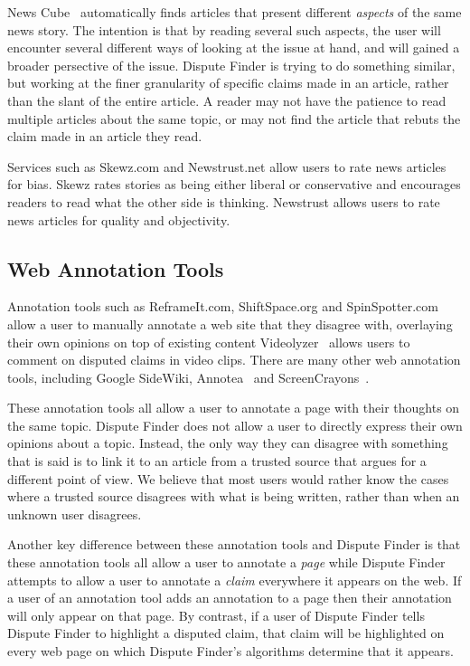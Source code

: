 \documentclass{www2010-submission}
\begin{document}
News Cube~\cite{Park2009} automatically finds articles that present different {\it aspects} of the same news story. The intention is that by reading several such aspects, the user will encounter several different ways of looking at the issue at hand, and will gained a broader persective of the issue. Dispute Finder is trying to do something similar, but working at the finer granularity of specific claims made in an article, rather than the slant of the entire article. A reader may not have the patience to read multiple articles about the same topic, or may not find the article that rebuts the claim made in an article they read. 

Services such as Skewz.com and Newstrust.net allow users to rate news articles for bias. Skewz rates stories as being either liberal or conservative and encourages readers to read what the other side is thinking. Newstrust allows users to rate news articles for quality and objectivity. 


\subsection{Web Annotation Tools}

Annotation tools such as ReframeIt.com, ShiftSpace.org and SpinSpotter.com allow a user to manually annotate a web site that they disagree with, overlaying their own opinions on top of existing content Videolyzer~\cite{Diakopoulos2008} allows users to comment on disputed claims in video clips. There are many other web annotation tools, including Google SideWiki, Annotea~\cite{Koivunen2001} and ScreenCrayons~\cite{Olsen2004}. 

These annotation tools all allow a user to annotate a page with their thoughts on the same topic. Dispute Finder does not allow a user to directly express their own opinions about a topic. Instead, the only way they can disagree with something that is said is to link it to an article from a trusted source that argues for a different point of view. We believe that most users would rather know the cases where a trusted source disagrees with what is being written, rather than when an unknown user disagrees.

Another key difference between these annotation tools and Dispute Finder is that these annotation tools all allow a user to annotate a {\it page} while Dispute Finder attempts to allow a user to annotate a {\it claim} everywhere it appears on the web. If a user of an annotation tool adds an annotation to a page then their annotation will only appear on that page. By contrast, if a user of Dispute Finder tells Dispute Finder to highlight a disputed claim, that claim will be highlighted on every web page on which Dispute Finder's algorithms determine that it appears.
\end{document}
